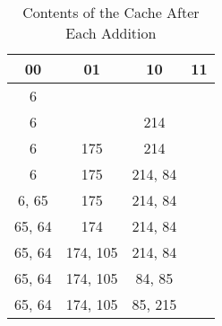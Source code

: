 \documentclass[10pt]{extarticle}
\begin{document}
\begin{enumerate}
\begin{enumerate}
            \begin{table}[h]
                \centering
                \caption{Contents of the Cache After Each Addition}
                \begin{tabular*}{200pt}{@{\extracolsep{\fill}}cccc}
                00 & 01 & 10 & 11 \\
                \hline
                6 & & &  \\
                6 & & 214 &  \\
                6 & 175 & 214 &  \\
                6 & 175 & 214, 84 &  \\
                6, 65 & 175 & 214, 84 &  \\
                65, 64 & 174 & 214, 84 &  \\
                65, 64 & 174, 105 & 214, 84 &  \\
                65, 64 & 174, 105 & 84, 85 &  \\
                65, 64 & 174, 105 & 85, 215 &  \\
                \end{tabular*}
            \end{table}

            \newpage

        \end{enumerate}

    \end{enumerate}
\end{document}
